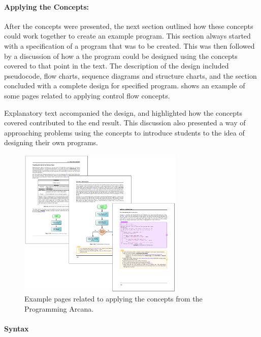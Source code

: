 
\clearpage
\paragraph{Applying the Concepts:} %
\label{par:applying_the_concepts_}

After the concepts were presented, the next section outlined how these concepts could work together to create an example program. This section always started with a specification of a program that was to be created. This was then followed by a discussion of how a the program could be designed using the concepts covered to that point in the text. The description of the design included pseudocode, flow charts, sequence diagrams and structure charts, and the section concluded with a complete design for specified program.  shows an example of some pages related to applying control flow concepts.

Explanatory text accompanied the design, and highlighted how the concepts covered contributed to the end result. This discussion also presented a way of approaching problems using the concepts to introduce students to the idea of designing their own programs.

\begin{figure}[h]
  \centering
  \includegraphics[width=0.7\textwidth]{ArcanaApplying}
  \caption{Example pages related to applying the concepts from the Programming Arcana.}
  \label{fig:arcana_applying}
\end{figure}


\clearpage
\paragraph{Syntax} %
\label{par:syntax}

